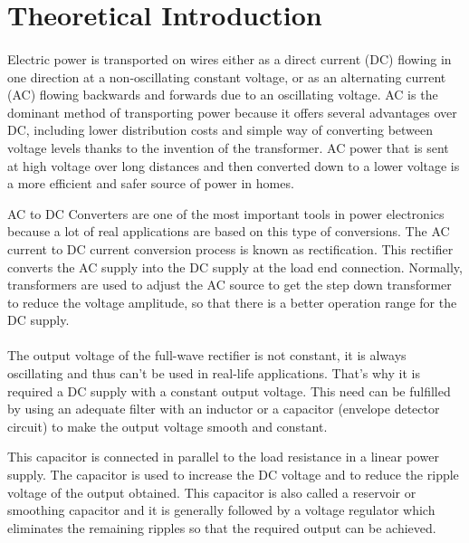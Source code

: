 \section{Theoretical Introduction}
\label{sec:theoretical}

\paragraph{}
Electric power is transported on wires either as a direct current (DC) flowing in one direction at a non-oscillating constant voltage, or as an alternating current (AC) flowing backwards and forwards due to an oscillating voltage. AC is the dominant method of transporting power because it offers several advantages over DC, including lower distribution costs and simple way of converting between voltage levels thanks to the invention of the transformer. AC power that is sent at high voltage over long distances and then converted down to a lower voltage is a more efficient and safer source of power in homes. 

AC to DC Converters are one of the most important tools in power electronics because a lot of real applications are based on this type of conversions. The AC current to DC current conversion process is known as rectification. This rectifier converts the  AC supply into the DC supply at the  load end connection. Normally, transformers are used to adjust the AC source to get the step down transformer to reduce the voltage amplitude, so that there is a better operation range for the DC supply.

\paragraph{}
The output voltage of the full-wave rectifier is not constant, it is always oscillating and thus can’t be used in real-life applications. That's why it is required a DC supply with a constant output voltage. This need can be fulfilled by using an adequate filter with an inductor or a capacitor (envelope detector circuit) to make the output voltage smooth and constant.

This capacitor is connected in parallel to the load resistance in a linear power supply. The capacitor is used to increase the DC voltage and to reduce the ripple voltage of the output obtained. This capacitor is also called a reservoir or smoothing capacitor and it is generally followed by a voltage regulator which eliminates the remaining ripples so that the required output can be achieved.

